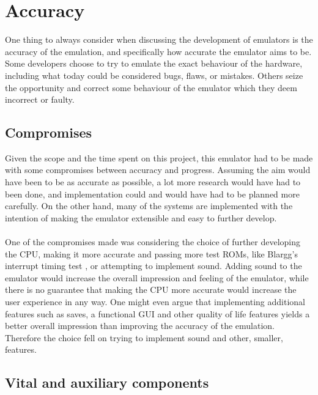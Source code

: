 \section{Accuracy}
One thing to always consider when discussing the development of emulators is the accuracy of the emulation, and specifically how accurate the emulator aims to be. Some developers choose to try to emulate the exact behaviour of the hardware, including what today could be considered bugs, flaws, or mistakes. Others seize the opportunity and correct some behaviour of the emulator which they deem incorrect or faulty.

\subsection{Compromises}

Given the scope and the time spent on this project, this emulator had to be made with some compromises between accuracy and progress. Assuming the aim would have been to be as accurate as possible, a lot more research would have had to been done, and implementation could and would have had to be planned more carefully. On the other hand, many of the systems are implemented with the intention of making the emulator extensible and easy to further develop.
\\\\
One of the compromises made was considering the choice of further developing the CPU, making it more accurate and passing more test ROMs, like Blargg's interrupt timing test \cite{Blargg}, or attempting to implement sound. Adding sound to the emulator would increase the overall impression and feeling of the emulator, while there is no guarantee that making the CPU more accurate would increase the user experience in any way. One might even argue that implementing additional features such as saves, a functional GUI and other quality of life features yields a better overall impression than improving the accuracy of the emulation. Therefore the choice fell on trying to implement sound and other, smaller, features.

\subsection{Vital and auxiliary components}

